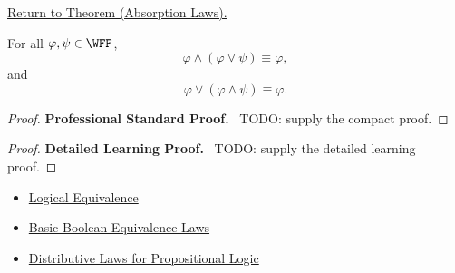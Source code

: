 \newpage
{}
\label{prf:absorption-laws-propositional-logic}

\begin{remark*}[Return]
\hyperref[thm:absorption-laws-propositional-logic]{Return to Theorem (Absorption Laws).}
\end{remark*}

\begin{theorem*}
For all \(\varphi,\psi\in\WFF\),
\[
\varphi\land(\varphi\lor\psi)\equiv\varphi,
\]
and
\[
\varphi\lor(\varphi\land\psi)\equiv\varphi.
\]
\end{theorem*}

\begin{proof}
\textbf{Professional Standard Proof.}~
TODO: supply the compact proof.
\end{proof}

\begin{proof}
\textbf{Detailed Learning Proof.}~
TODO: supply the detailed learning proof.
\end{proof}

\begin{remark*}
\end{remark*}

\begin{dependencies}
\begin{itemize}
  \item \hyperref[def:logical-equivalence-propositional-logic]{Logical Equivalence}
  \item \hyperref[thm:basic-boolean-equivalence-laws-propositional-logic]{Basic Boolean Equivalence Laws}
  \item \hyperref[thm:distributive-laws-propositional-logic]{Distributive Laws for Propositional Logic}
\end{itemize}
\end{dependencies}

\clearpage
